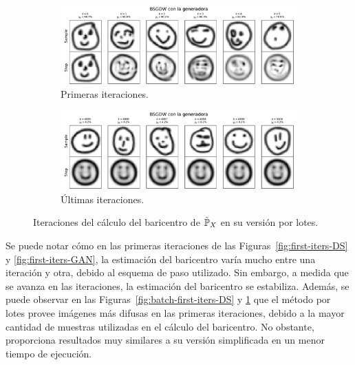 \begin{figure}[H]
    \centering
    \begin{subfigure}[b]{0.75\textwidth}
        \includegraphics[width=\textwidth]{img/sgdw-iters/batch-first-iters-GAN.pdf}
        \caption{Primeras iteraciones.}
        \label{fig:batch-first-iters-GAN}
    \end{subfigure}
    \begin{subfigure}[b]{0.75\textwidth}
        \includegraphics[width=\textwidth]{img/sgdw-iters/batch-last-iters-GAN.pdf}
        \caption{Últimas iteraciones.}
        \label{fig:batch-last-iters-GAN}
    \end{subfigure}
    \caption{Iteraciones del cálculo del baricentro de $\tilde\Prob_X$ en su versión por lotes.}
    \label{fig:batch-iters-GAN}
\end{figure}

Se puede notar cómo en las primeras iteraciones de las Figuras~\ref{fig:first-iters-DS} y \ref{fig:first-iters-GAN}, la estimación del baricentro varía mucho entre una iteración y otra, debido al esquema de paso utilizado. Sin embargo, a medida que se avanza en las iteraciones, la estimación del baricentro se estabiliza. Además, se puede observar en las Figuras~\ref{fig:batch-first-iters-DS} y \ref{fig:batch-first-iters-GAN} que el método por lotes provee imágenes más difusas en las primeras iteraciones, debido a la mayor cantidad de muestras utilizadas en el cálculo del baricentro. No obstante, proporciona resultados muy similares a su versión simplificada en un menor tiempo de ejecución.














